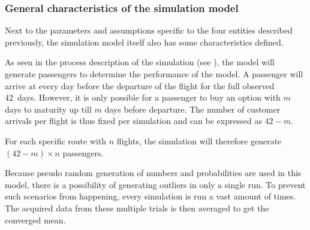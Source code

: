 \subsubsection{General characteristics of the simulation model}
Next to the parameters and assumptions specific to the four entities described previously, the simulation model itself also has some characteristics defined.

As seen in the process description of the simulation (see ), the model will generate passengers to determine the performance of the model. A passenger will arrive at every day before the departure of the flight for the full observed 42~days. However, it is only possible for a passenger to buy an option with $m$ days to maturity up till $m$ days before departure. The number of customer arrivals per flight is thus fixed per simulation and can be expressed as $42 - m$.

For each specific route with $n$ flights, the simulation will therefore generate $(42 - m) \times n$ passengers.

Because pseudo random generation of numbers and probabilities are used in this model, there is a possibility of generating outliers in only a single run. To prevent such scenarios from happening, every simulation is run a vast amount of times. The acquired data from these multiple trials is then averaged to get the converged mean.


